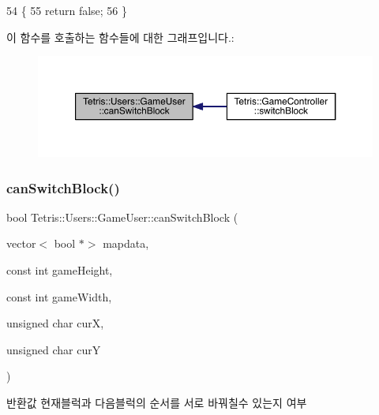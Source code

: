 \begin{DoxyCode}
54                                      \{
55                     \textcolor{keywordflow}{return} \textcolor{keyword}{false};
56                 \}
\end{DoxyCode}
이 함수를 호출하는 함수들에 대한 그래프입니다.\+:
\nopagebreak
\begin{figure}[H]
\begin{center}
\leavevmode
\includegraphics[width=350pt]{d8/d9a/class_tetris_1_1_users_1_1_game_user_a8a777ef1ffbbc53ebae4172830863eb4_icgraph}
\end{center}
\end{figure}
\mbox{\label{class_tetris_1_1_users_1_1_game_user_a1962ed051506010440645f7f3b50760d}} 
\subsubsection{\texorpdfstring{can\+Switch\+Block()}{canSwitchBlock()}\hspace{0.1cm}{\footnotesize\ttfamily [2/2]}}
{\footnotesize\ttfamily bool Tetris\+::\+Users\+::\+Game\+User\+::can\+Switch\+Block (\begin{DoxyParamCaption}\item[{vector$<$ bool $\ast$$>$}]{mapdata,  }\item[{const int}]{game\+Height,  }\item[{const int}]{game\+Width,  }\item[{unsigned char}]{curX,  }\item[{unsigned char}]{curY }\end{DoxyParamCaption})\hspace{0.3cm}{\ttfamily [inline]}}

\begin{DoxyReturn}{반환값}
현재블럭과 다음블럭의 순서를 서로 바꿔칠수 있는지 여부 
\end{DoxyReturn}


